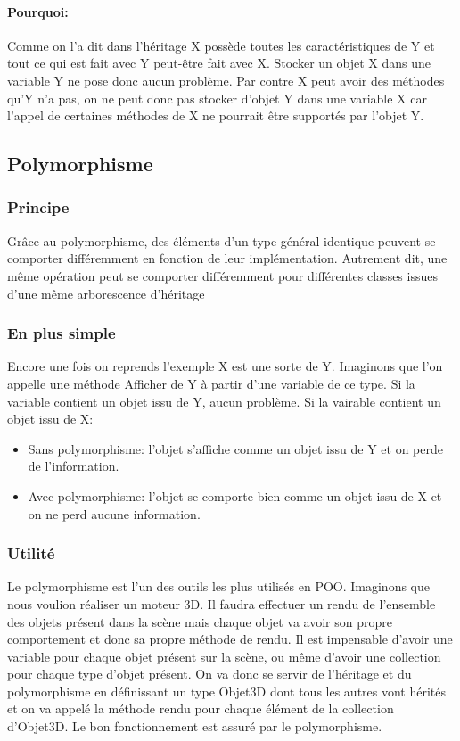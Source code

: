 \documentclass[10pt,a4paper,twoside]{article}
\begin{document}
\paragraph{Pourquoi:} Comme on l'a dit dans l'héritage X possède toutes les caractéristiques de Y et tout ce qui est fait avec Y peut-être fait avec X. Stocker un objet X dans une variable Y ne pose donc aucun problème. Par contre X peut avoir des méthodes qu'Y n'a pas, on ne peut donc pas stocker d'objet Y dans une variable X car l'appel de certaines méthodes de X ne pourrait être supportés par l'objet Y.

\subsection{Polymorphisme}
\subsubsection{Principe}
Grâce au polymorphisme, des éléments d'un type général identique peuvent se comporter différemment en fonction de leur implémentation. Autrement dit, une même opération peut se comporter différemment pour différentes classes issues d'une même arborescence d'héritage

\subsubsection{En plus simple}
Encore une fois on reprends l'exemple X est une sorte de Y. Imaginons que l'on appelle une méthode Afficher de Y à partir d'une variable de ce type. Si la variable contient un objet issu de Y, aucun problème. Si la vairable contient un objet issu de X: 
\begin{itemize}
\item Sans polymorphisme: l'objet s'affiche comme un objet issu de Y et on perde de l'information.
\item Avec polymorphisme: l'objet se comporte bien comme un objet issu de X et on ne perd aucune information.
\end{itemize}

\subsubsection{Utilité}
Le polymorphisme est l'un des outils les plus utilisés en POO. Imaginons que nous voulion réaliser un moteur 3D. Il faudra effectuer un rendu de l'ensemble des objets présent dans la scène mais chaque objet va avoir son propre comportement et donc sa propre méthode de rendu. Il est impensable d'avoir une variable pour chaque objet présent sur la scène, ou même d'avoir une collection pour chaque type d'objet présent. On va donc se servir de l'héritage et du polymorphisme en définissant un type Objet3D dont tous les autres vont hérités et on va appelé la méthode rendu pour chaque élément de la collection d'Objet3D. Le bon fonctionnement est assuré par le polymorphisme.
\end{document}
